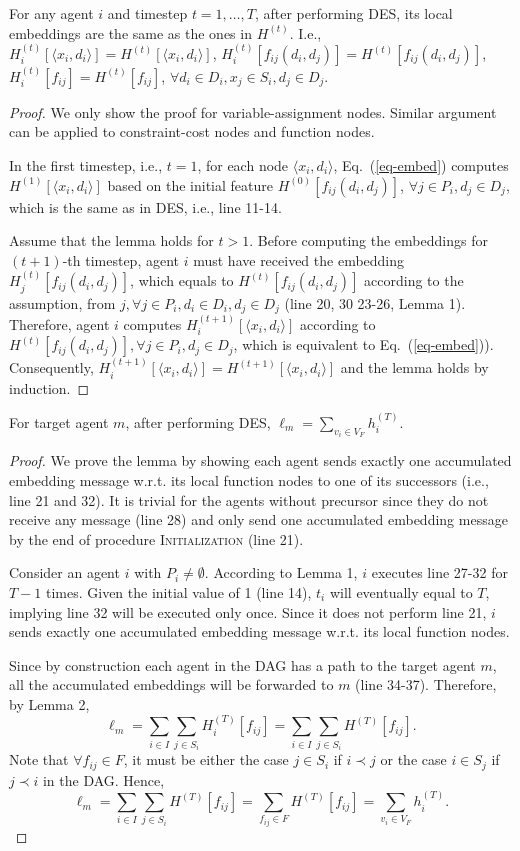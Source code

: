 \documentclass[letterpaper]{article} %
\begin{document}
\begin{lemma}
For any agent $i$ and timestep $t=1,\dots,T$, after performing DES, its local embeddings are the same as the ones in $H^{(t)}$. I.e., $H^{(t)}_i[\langle x_i,d_i\rangle]=H^{(t)}[\langle x_i,d_i\rangle]$, $H_i^{(t)}[f_{ij}(d_i,d_j)]=H^{(t)}[f_{ij}(d_i,d_j)]$, $H_i^{(t)}[f_{ij}]=H^{(t)}[f_{ij}]$, $\forall d_i\in D_i, x_j\in S_i, d_j\in D_j$.
\end{lemma}
\begin{proof}
We only show the proof for variable-assignment nodes. Similar argument can be applied to constraint-cost nodes and function nodes.

In the first timestep, i.e., $t=1$, for each node $\langle x_i,d_i\rangle$, Eq.~(\ref{eq-embed}) computes $H^{(1)}[\langle x_i,d_i\rangle]$ based on the initial feature $H^{(0)}[f_{ij}(d_i,d_j)]$, $\forall j\in P_i, d_j\in D_j$, which is the same as in DES, i.e., line 11-14.

Assume that the lemma holds for $t>1$. Before computing the embeddings for $(t+1)$-th timestep, agent $i$ must have received the embedding $H_j^{(t)}[f_{ij}(d_i,d_j)]$, which equals to $H^{(t)}[f_{ij}(d_i,d_j)]$ according to the assumption, from $j, \forall j\in P_i, d_i\in D_i,d_j\in D_j$ (line 20, 30 23-26, Lemma 1). Therefore, agent $i$ computes $H_i^{(t+1)}[\langle x_i,d_i\rangle]$ according to $H^{(t)}[f_{ij}(d_i,d_j)],\forall j\in P_i, d_j\in D_j$, which is equivalent to Eq.~(\ref{eq-embed})). Consequently, $H_i^{(t+1)}[\langle x_i,d_i\rangle]=H^{(t+1)}[\langle x_i,d_i\rangle]$ and the lemma holds by induction.
\end{proof}
\begin{lemma}
For target agent $m$, after performing DES, $\ell_m=\sum_{v_i\in V_F}h_i^{(T)}$.
\end{lemma}
\begin{proof}
We prove the lemma by showing each agent sends exactly one accumulated embedding message w.r.t. its local function nodes to one of its successors (i.e., line 21 and 32). It is trivial for the agents without precursor since they do not receive any message (line 28) and only send one accumulated embedding message by the end of procedure \textsc{Initialization} (line 21).

Consider an agent $i$ with $P_i\ne\emptyset$. According to Lemma 1, $i$ executes line 27-32 for $T-1$ times. Given the initial value of 1 (line 14), $t_i$ will eventually equal to $T$, implying line 32 will be executed only once. Since it does not perform line 21, $i$ sends exactly one accumulated embedding message w.r.t. its local function nodes.

Since by construction each agent in the DAG has a path to the target agent $m$, all the accumulated embeddings will be forwarded to $m$ (line 34-37). Therefore, by Lemma 2,
\[
\ell_m=\sum_{i\in I}\sum_{j\in S_i}H_i^{(T)}[f_{ij}]=\sum_{i\in I}\sum_{j\in S_i}H^{(T)}[f_{ij}].
\]
Note that $\forall f_{ij}\in F$, it must be either the case $j\in S_i$ if $i\prec j$ or the case $i\in S_j$ if $j\prec i$ in the DAG. Hence,
\[
\ell_m=\sum_{i\in I}\sum_{j\in S_i}H^{(T)}[f_{ij}]=\sum_{f_{ij}\in F}H^{(T)}[f_{ij}]=\sum_{v_i\in V_F}h_i^{(T)}.
\]
\end{proof}
\end{document}
